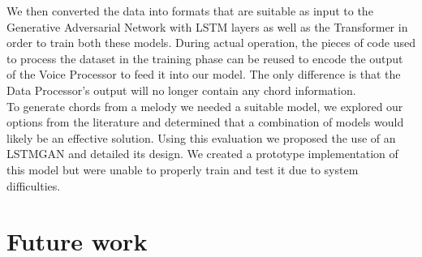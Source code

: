 We then converted the data into formats that are suitable as input to the Generative Adversarial Network with LSTM layers as well as the Transformer in order to train both these models. 
During actual operation, the pieces of code used to process the dataset in the training phase can be reused to encode the output of the Voice Processor to feed it into our model. 
The only difference is that the Data Processor’s output will no longer contain any chord information.
\\
To generate chords from a melody we needed a suitable model, we explored our options from the literature and determined that a combination of models would likely be an effective solution.
Using this evaluation we proposed the use of an LSTMGAN and detailed its design.
We created a prototype implementation of this model but were unable to properly train and test it due to system difficulties.

\section{Future work}

